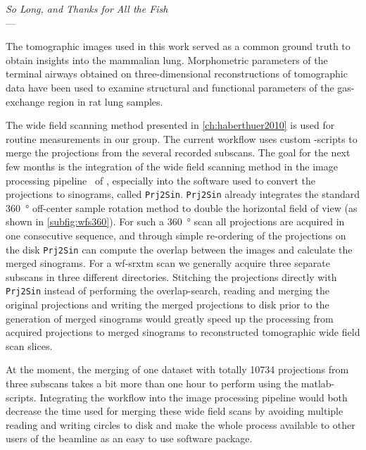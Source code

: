 \acresetall
{}\label{ch:outlook}
\begin{flushright}{\slshape    
		So Long, and Thanks for All the Fish} \\ \medskip
    ---  \citep{Adams1984}
\end{flushright}

\vfill

The tomographic images used in this work served as a common ground truth to obtain insights into the mammalian lung. Morphometric parameters of the terminal airways obtained on three-dimensional reconstructions of tomographic data have been used to examine structural and functional parameters of the gas-exchange region in rat lung samples.

The wide field scanning method presented in \autoref{ch:haberthuer2010} is used for routine measurements in our group. The current workflow uses custom -scripts to merge the projections from the several recorded subscans. The goal for the next few months is the integration of the wide field scanning method in the image processing pipeline~\cite{Hintermueller2010} of , especially into the software used to convert the projections to sinograms, called \texttt{Prj2Sin}. \texttt{Prj2Sin} already integrates the standard \SI{360}{\degree} off-center sample rotation method to double the horizontal field of view (as shown in \autoref{subfig:wfs360}). For such a \SI{360}{\degree} scan all projections are acquired in one consecutive sequence, and through simple re-ordering of the projections on the disk \texttt{Prj2Sin} can compute the overlap between the images and calculate the merged sinograms. For a \ac{wf-srxtm} scan we generally acquire three separate subscans in three different directories. Stitching the projections directly with \texttt{Prj2Sin} instead of performing the overlap-search, reading and merging the original projections and writing the merged projections to disk prior to the generation of merged sinograms would greatly speed up the processing from acquired projections to merged sinograms to reconstructed tomographic wide field scan slices.

At the moment, the merging of one dataset with totally \num{10734} projections from three subscans takes a bit more than one hour to perform using the \ac{matlab}-scripts. Integrating the workflow into the image processing pipeline would both decrease the time used for merging these wide field scans by avoiding multiple reading and writing circles to disk and make the whole process available to other users of the beamline as an easy to use software package.

